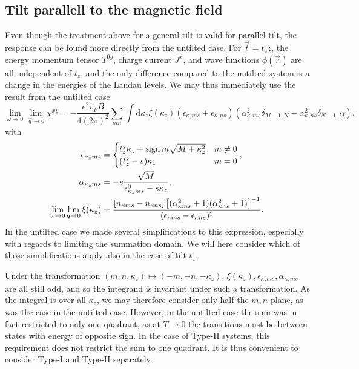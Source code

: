 \subsection{Tilt parallell to the magnetic field}
Even though the treatment above for a general tilt is valid for parallel tilt, the response can be found more directly from the untilted case.
For \( \vec{t} = t_z \hat{z} \), the energy momentum tensor \( T^{0y} \), charge current \( J^x \), and wave functions \( \phi(\vec{r}) \) are all independent of \( t_z \), and the only difference compared to the untilted system is a change in the energies of the Landau levels.
We may thus immediately use the result from the untilted case
\begin{equation}
  \label{eq:129}
  \lim_{\omega \to 0} \lim_{\vec{q} \to 0} \chi^{xy} =
  - \frac{e^2 v_F B}{4(2\pi)^2}
  \sum\limits_{mn} \int \mathrm{d} \kappa_z
  \xi(\kappa_z)
  (\epsilon_{\kappa_z m s} + \epsilon_{\kappa_z n s})
  (\alpha_{\kappa_z m s}^2 \delta_{M-1, N} - \alpha_{\kappa_z n s}^2 \delta_{N-1, M}),
\end{equation}
with
\begin{align}
  \label{eq:95}
  \epsilon_{\kappa_z m s} &=
                          \begin{cases}
                            t_z^s \kappa_z + \operatorname{sign}{m} \sqrt{M + \kappa_z^2} & m \neq 0\\
                            (t_z^s - s) \kappa_z & m = 0
                          \end{cases},\\
  \alpha_{\kappa_z m s} &=
                          -s \frac{\sqrt{M}}{\epsilon_{\kappa_z  m s}^0 - s \kappa_z },\\
  \lim_{\omega \to 0} \lim_{\bm{q} \to 0}\xi(\kappa_z) &= \frac{[n_{\kappa ms} - n_{\kappa ns}]
  \left[ (\alpha_{\kappa ms}^2 + 1) (\alpha_{\kappa ns}^2 + 1) \right]^{-1}
  }{
    (\epsilon _{\kappa m s} - \epsilon _{\kappa n s})^2
  }.
\end{align}
In the untilted case we made several simplifications to this expression, especially with regards to limiting the summation domain.
We will here consider which of those simplifications apply also in the case of tilt \( t_z \).

Under the transformation \( (m,n,\kappa_z) \mapsto (-m, -n , -\kappa_z) \), \( \xi(\kappa_z), \epsilon_{\kappa_z m s}, \alpha_{\kappa_z m s} \) are all still odd, and so the integrand is invariant under such a transformation.
As the integral is over all \( \kappa_z \), we may therefore consider only half the \( m,n \) plane, as was the case in the untilted case.
However, in the untilted case the sum was in fact restricted to only one quadrant, as at \( T\to 0 \) the transitions must be between states with energy of opposite sign.
In the case of Type-II systems, this requirement does not restrict the sum to one quadrant.
It is thus convenient to consider Type-I and Type-II separately.

